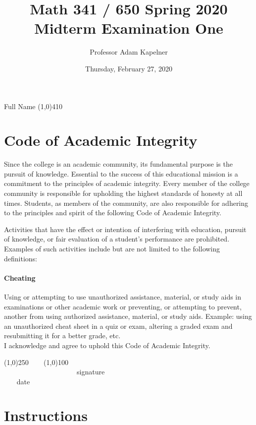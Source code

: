 \documentclass[12pt]{article}
\title{Math 341 / 650 Spring 2020 \\ Midterm Examination One}
\author{Professor Adam Kapelner}
\date{Thursday, February 27, 2020}
\begin{document}
\maketitle

\noindent Full Name \line(1,0){410}

\thispagestyle{empty}

\section*{Code of Academic Integrity}

\footnotesize
Since the college is an academic community, its fundamental purpose is the pursuit of knowledge. Essential to the success of this educational mission is a commitment to the principles of academic integrity. Every member of the college community is responsible for upholding the highest standards of honesty at all times. Students, as members of the community, are also responsible for adhering to the principles and spirit of the following Code of Academic Integrity.

Activities that have the effect or intention of interfering with education, pursuit of knowledge, or fair evaluation of a student's performance are prohibited. Examples of such activities include but are not limited to the following definitions:

\paragraph{Cheating} Using or attempting to use unauthorized assistance, material, or study aids in examinations or other academic work or preventing, or attempting to prevent, another from using authorized assistance, material, or study aids. Example: using an unauthorized cheat sheet in a quiz or exam, altering a graded exam and resubmitting it for a better grade, etc.
\\

\noindent I acknowledge and agree to uphold this Code of Academic Integrity. \\

\begin{center}
\line(1,0){250} ~~~ \line(1,0){100}\\
~~~~~~~~~~~~~~~~~~~~~signature~~~~~~~~~~~~~~~~~~~~~~~~~~~~~~~~~~~~~~~~~~~~~ date
\end{center}

\normalsize

\section*{Instructions}
\end{document}
